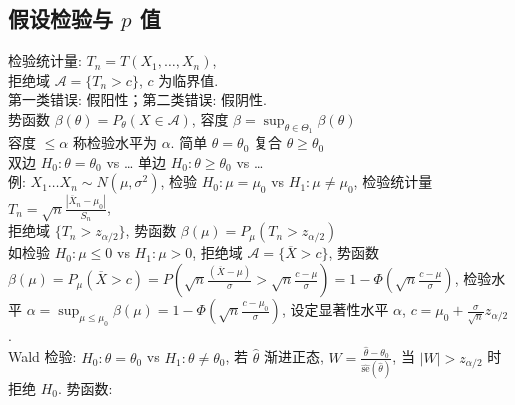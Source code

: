 \documentclass[a4paper, landscape,10pt]{article}
\begin{document}
\begin{multicols}{4}
\section{假设检验与 $p$ 值}
检验统计量: $T_n = T(X_1, \dots, X_n)$, \\
拒绝域 $\mathcal{A} = \{T_n > c\}$, $c$ 为临界值. \\
第一类错误: 假阳性；第二类错误: 假阴性. \\
势函数 $\beta(\theta) = P_\theta(X\in \mathcal{A})$, 容度 $\beta = \sup_{\theta \in \Theta_1} \beta(\theta)$\\
容度 $\leq \alpha$ 称检验水平为 $\alpha$. 简单 $\theta = \theta_0$ 复合 $\theta \geq \theta_0$ \\
双边 $H_0 : \theta = \theta_0$ vs \dots
单边 $H_0 : \theta \geq \theta_0$ vs \dots\\
例: $X_1 \dots X_n \sim N(\mu, \sigma^2)$, 检验 $H_0 : \mu = \mu_0$ vs $H_1 : \mu \neq \mu_0$,
检验统计量 $T_n = \sqrt{n} \frac{|\overline X_n - \mu_0|}{S_n}$, \\
拒绝域 $\{T_n > z_{\alpha/2}\}$,
势函数 $\beta(\mu) = P_\mu(T_n > z_{\alpha/2})$\\
如检验 $H_0: \mu \leq 0$ vs $H_1: \mu > 0$,
拒绝域 $\mathcal{A} = \{\overline X > c\}$,
势函数 $\beta(\mu) = P_\mu(\overline X > c) = P(\sqrt{n}\frac {(\overline X - \mu)} {\sigma} > \sqrt{n} \frac {c - \mu} {\sigma}) = 1 - \Phi(\sqrt{n} \frac {c - \mu} {\sigma})$,
检验水平 $\alpha = \sup_{\mu \leq \mu_0} \beta(\mu) = 1 - \Phi(\sqrt{n} \frac {c - \mu_0} {\sigma})$,
设定显著性水平 $\alpha$, $c=\mu_0 + \frac{\sigma}{\sqrt{n}} z_{\alpha / 2}$. \\
Wald 检验: $H_0: \theta = \theta_0$ vs $H_1: \theta \neq \theta_0$,
若 $\hat \theta$ 渐进正态, $W = \frac{\hat \theta - \theta_0}{\hat {\mathrm{se}}(\hat \theta)}$, 当 $|W| > z_{\alpha / 2}$ 时拒绝 $H_0$. 势函数: 


\end{multicols}
\end{document}
